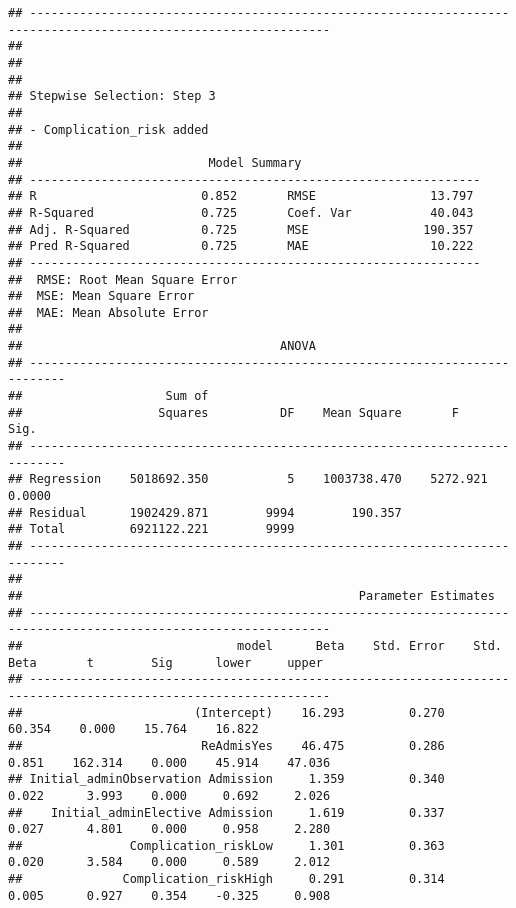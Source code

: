 \documentclass[
]{article}
\begin{document}
\begin{verbatim}
## ----------------------------------------------------------------------------------------------------------------
## 
## 
## 
## Stepwise Selection: Step 3 
## 
## - Complication_risk added 
## 
##                          Model Summary                          
## ---------------------------------------------------------------
## R                       0.852       RMSE                13.797 
## R-Squared               0.725       Coef. Var           40.043 
## Adj. R-Squared          0.725       MSE                190.357 
## Pred R-Squared          0.725       MAE                 10.222 
## ---------------------------------------------------------------
##  RMSE: Root Mean Square Error 
##  MSE: Mean Square Error 
##  MAE: Mean Absolute Error 
## 
##                                    ANOVA                                    
## ---------------------------------------------------------------------------
##                    Sum of                                                  
##                   Squares          DF    Mean Square       F          Sig. 
## ---------------------------------------------------------------------------
## Regression    5018692.350           5    1003738.470    5272.921    0.0000 
## Residual      1902429.871        9994        190.357                       
## Total         6921122.221        9999                                      
## ---------------------------------------------------------------------------
## 
##                                               Parameter Estimates                                                
## ----------------------------------------------------------------------------------------------------------------
##                              model      Beta    Std. Error    Std. Beta       t        Sig      lower     upper 
## ----------------------------------------------------------------------------------------------------------------
##                        (Intercept)    16.293         0.270                  60.354    0.000    15.764    16.822 
##                         ReAdmisYes    46.475         0.286        0.851    162.314    0.000    45.914    47.036 
## Initial_adminObservation Admission     1.359         0.340        0.022      3.993    0.000     0.692     2.026 
##    Initial_adminElective Admission     1.619         0.337        0.027      4.801    0.000     0.958     2.280 
##               Complication_riskLow     1.301         0.363        0.020      3.584    0.000     0.589     2.012 
##              Complication_riskHigh     0.291         0.314        0.005      0.927    0.354    -0.325     0.908 

\end{verbatim}
\end{document}
